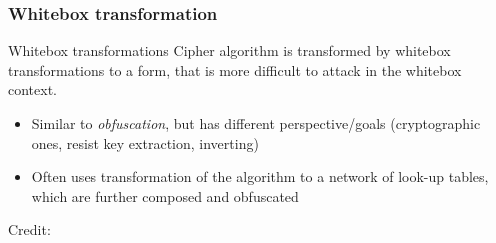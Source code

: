 \documentclass{beamer}
\begin{document}
\begin{frame}
    \frametitle{Whitebox transformation}
    \begin{block}{Whitebox transformations}
     Cipher algorithm is transformed by whitebox transformations to a form, that is more difficult to attack in the whitebox context.
	
     \begin{itemize}
      \item Similar to \emph{obfuscation}, but has different perspective/goals (cryptographic ones, resist key extraction, inverting)
      \item Often uses transformation of the algorithm to a network of look-up tables, which are further composed and obfuscated
     \end{itemize}
    \end{block}
    \centerline{}
    \centerline{\hbox{\tiny Credit:}}
    
\end{frame}
\end{document}
